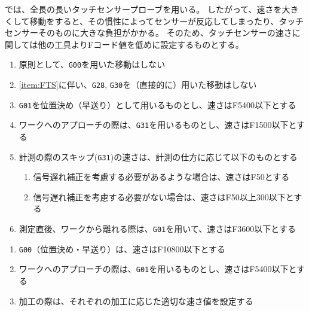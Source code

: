


\DMname では、全長の長いタッチセンサープローブを用いる。
したがって、速さを大きくして移動をすると、その慣性によってセンサーが反応してしまったり、タッチセンサーそのものに大きな負担がかかる。
そのため、タッチセンサーの速さに関しては他の工具よりFコード値を低めに設定するものとする。


\begin{enumerate}[label=\Roman*., ref=\Roman*]
\item\label{item:FTS} 原則として、\verb|G00|を用いた移動はしない
\item \ref{item:FTS}に伴い、\verb|G28|, \verb|G30|を（直接的に）用いた移動はしない
\item \verb|G01|を位置決め（早送り）として用いるものとし、速さはF5400以下とする
\item ワークへのアプローチの際は、\verb|G31|を用いるものとし、速さはF1500以下とする
\item 計測の際のスキップ(\verb|G31|)の速さは、計測の仕方に応じて以下のものとする
  \begin{enumerate}
  \item {}信号遅れ補正を考慮する必要があるような場合は、速さはF50とする
  \item 信号遅れ補正を考慮する必要がない場合は、速さはF50以上300以下とする
  \end{enumerate}
\item 測定直後、ワークから離れる際は、\verb|G01|を用いて、速さはF3600以下とする
\end{enumerate}



\begin{enumerate}[label=\Roman*., ref=\Roman*]
\item \verb|G00|（位置決め・早送り）は、速さはF10800以下とする
\item ワークへのアプローチの際は、\verb|G01|を用いるものとし、速さはF5400以下とする
\item 加工の際は、それぞれの加工に応じた適切な速さ値を設定する
\end{enumerate}

